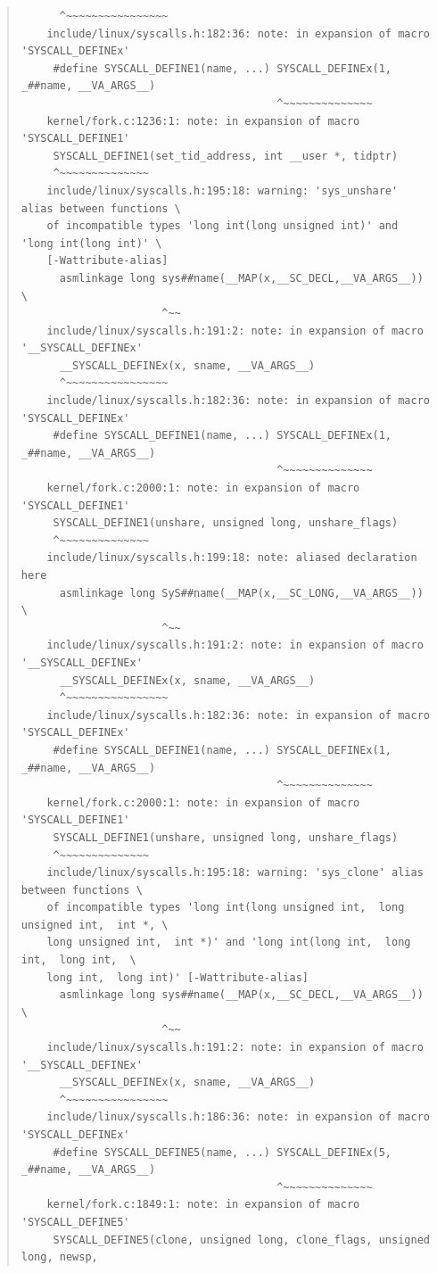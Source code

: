 \documentclass{article}
\begin{document}
\begin{quote}
\begin{verbatim}
	  ^~~~~~~~~~~~~~~~~
	include/linux/syscalls.h:182:36: note: in expansion of macro 'SYSCALL_DEFINEx'
	 #define SYSCALL_DEFINE1(name, ...) SYSCALL_DEFINEx(1, _##name, __VA_ARGS__)
	                                    ^~~~~~~~~~~~~~~
	kernel/fork.c:1236:1: note: in expansion of macro 'SYSCALL_DEFINE1'
	 SYSCALL_DEFINE1(set_tid_address, int __user *, tidptr)
	 ^~~~~~~~~~~~~~~
	include/linux/syscalls.h:195:18: warning: 'sys_unshare' alias between functions \
	of incompatible types 'long int(long unsigned int)' and 'long int(long int)' \
	[-Wattribute-alias]
	  asmlinkage long sys##name(__MAP(x,__SC_DECL,__VA_ARGS__)) \
	                  ^~~
	include/linux/syscalls.h:191:2: note: in expansion of macro '__SYSCALL_DEFINEx'
	  __SYSCALL_DEFINEx(x, sname, __VA_ARGS__)
	  ^~~~~~~~~~~~~~~~~
	include/linux/syscalls.h:182:36: note: in expansion of macro 'SYSCALL_DEFINEx'
	 #define SYSCALL_DEFINE1(name, ...) SYSCALL_DEFINEx(1, _##name, __VA_ARGS__)
	                                    ^~~~~~~~~~~~~~~
	kernel/fork.c:2000:1: note: in expansion of macro 'SYSCALL_DEFINE1'
	 SYSCALL_DEFINE1(unshare, unsigned long, unshare_flags)
	 ^~~~~~~~~~~~~~~
	include/linux/syscalls.h:199:18: note: aliased declaration here
	  asmlinkage long SyS##name(__MAP(x,__SC_LONG,__VA_ARGS__)) \
	                  ^~~
	include/linux/syscalls.h:191:2: note: in expansion of macro '__SYSCALL_DEFINEx'
	  __SYSCALL_DEFINEx(x, sname, __VA_ARGS__)
	  ^~~~~~~~~~~~~~~~~
	include/linux/syscalls.h:182:36: note: in expansion of macro 'SYSCALL_DEFINEx'
	 #define SYSCALL_DEFINE1(name, ...) SYSCALL_DEFINEx(1, _##name, __VA_ARGS__)
	                                    ^~~~~~~~~~~~~~~
	kernel/fork.c:2000:1: note: in expansion of macro 'SYSCALL_DEFINE1'
	 SYSCALL_DEFINE1(unshare, unsigned long, unshare_flags)
	 ^~~~~~~~~~~~~~~
	include/linux/syscalls.h:195:18: warning: 'sys_clone' alias between functions \
	of incompatible types 'long int(long unsigned int,  long unsigned int,  int *, \
	long unsigned int,  int *)' and 'long int(long int,  long int,  long int,  \
	long int,  long int)' [-Wattribute-alias]
	  asmlinkage long sys##name(__MAP(x,__SC_DECL,__VA_ARGS__)) \
	                  ^~~
	include/linux/syscalls.h:191:2: note: in expansion of macro '__SYSCALL_DEFINEx'
	  __SYSCALL_DEFINEx(x, sname, __VA_ARGS__)
	  ^~~~~~~~~~~~~~~~~
	include/linux/syscalls.h:186:36: note: in expansion of macro 'SYSCALL_DEFINEx'
	 #define SYSCALL_DEFINE5(name, ...) SYSCALL_DEFINEx(5, _##name, __VA_ARGS__)
	                                    ^~~~~~~~~~~~~~~
	kernel/fork.c:1849:1: note: in expansion of macro 'SYSCALL_DEFINE5'
	 SYSCALL_DEFINE5(clone, unsigned long, clone_flags, unsigned long, newsp,

\end{verbatim}
\end{quote}
\end{document}
